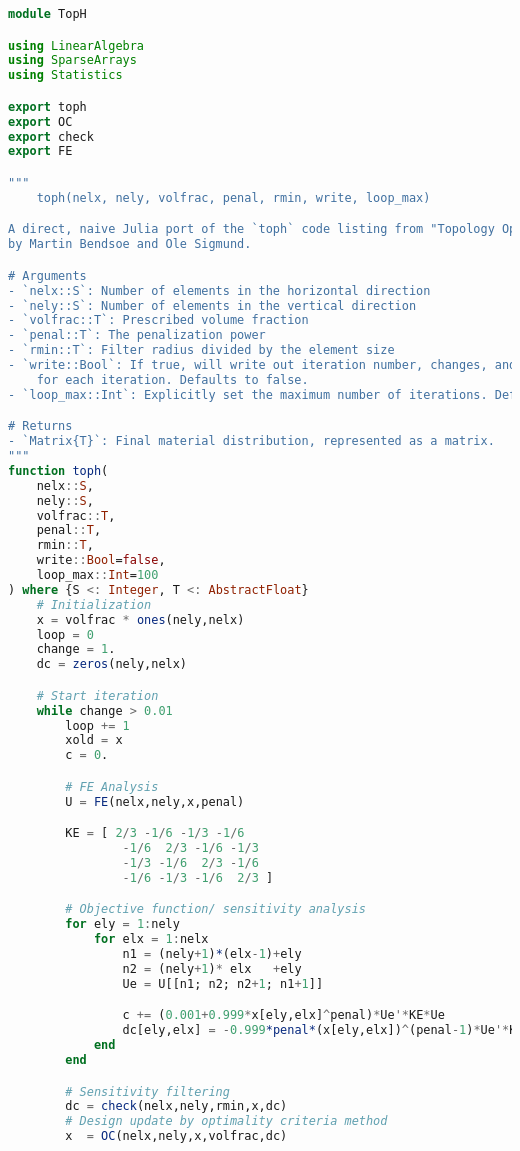 \begin{lstlisting}[language=Julia, title=\texttt{toph.jl}, label={lst:toph}]
module TopH

using LinearAlgebra
using SparseArrays
using Statistics

export toph
export OC
export check
export FE

"""
    toph(nelx, nely, volfrac, penal, rmin, write, loop_max)

A direct, naive Julia port of the `toph` code listing from "Topology Optimization"
by Martin Bendsoe and Ole Sigmund.

# Arguments
- `nelx::S`: Number of elements in the horizontal direction
- `nely::S`: Number of elements in the vertical direction
- `volfrac::T`: Prescribed volume fraction
- `penal::T`: The penalization power
- `rmin::T`: Filter radius divided by the element size
- `write::Bool`: If true, will write out iteration number, changes, and density
    for each iteration. Defaults to false.
- `loop_max::Int`: Explicitly set the maximum number of iterations. Defaults to 1000.

# Returns
- `Matrix{T}`: Final material distribution, represented as a matrix.
"""
function toph(
    nelx::S,
    nely::S,
    volfrac::T,
    penal::T,
    rmin::T,
    write::Bool=false, 
    loop_max::Int=100
) where {S <: Integer, T <: AbstractFloat}
    # Initialization
    x = volfrac * ones(nely,nelx)
    loop = 0
    change = 1.
    dc = zeros(nely,nelx)

    # Start iteration
    while change > 0.01
        loop += 1
        xold = x
        c = 0.

        # FE Analysis
        U = FE(nelx,nely,x,penal)

        KE = [ 2/3 -1/6 -1/3 -1/6
                -1/6  2/3 -1/6 -1/3
                -1/3 -1/6  2/3 -1/6
                -1/6 -1/3 -1/6  2/3 ]

        # Objective function/ sensitivity analysis
        for ely = 1:nely
            for elx = 1:nelx
                n1 = (nely+1)*(elx-1)+ely
                n2 = (nely+1)* elx   +ely
                Ue = U[[n1; n2; n2+1; n1+1]]

                c += (0.001+0.999*x[ely,elx]^penal)*Ue'*KE*Ue
                dc[ely,elx] = -0.999*penal*(x[ely,elx])^(penal-1)*Ue'*KE*Ue
            end
        end

        # Sensitivity filtering 
        dc = check(nelx,nely,rmin,x,dc)
        # Design update by optimality criteria method
        x  = OC(nelx,nely,x,volfrac,dc)


\end{lstlisting}
